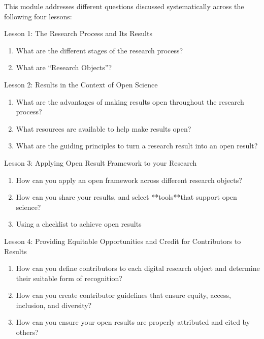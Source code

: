 \documentclass[
  letterpaper,
  DIV=11,
  numbers=noendperiod]{scrreport}
\providecommand{\tightlist}{%
  \setlength{\itemsep}{0pt}\setlength{\parskip}{0pt}}\usepackage{longtable,booktabs,array}
\begin{document}

This module addresses different questions discussed systematically
across the following four lessons:

Lesson 1: The Research Process and Its Results

\begin{enumerate}
\def\labelenumi{\arabic{enumi}.}
\tightlist
\item
  What are the different stages of the research process?
\item
  What are ``Research Objects''?
\end{enumerate}

Lesson 2: Results in the Context of Open Science

\begin{enumerate}
\def\labelenumi{\arabic{enumi}.}
\tightlist
\item
  What are the advantages of making results open throughout the research
  process?
\item
  What resources are available to help make results open?
\item
  What are the guiding principles to turn a research result into an open
  result?
\end{enumerate}

Lesson 3: Applying Open Result Framework to your Research

\begin{enumerate}
\def\labelenumi{\arabic{enumi}.}
\tightlist
\item
  How can you apply an open framework across different research objects?
\item
  How can you share your results, and select **tools**that support open
  science?
\item
  Using a checklist to achieve open results
\end{enumerate}

Lesson 4: Providing Equitable Opportunities and Credit for Contributors
to Results

\begin{enumerate}
\def\labelenumi{\arabic{enumi}.}
\tightlist
\item
  How can you define contributors to each digital research object and
  determine their suitable form of recognition?
\item
  How can you create contributor guidelines that ensure equity, access,
  inclusion, and diversity?
\item
  How can you ensure your open results are properly attributed and cited
  by others?
\end{enumerate}
\end{document}
